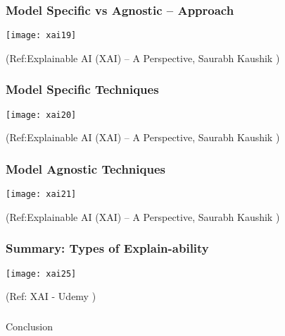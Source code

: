 \begin{frame}[fragile]\frametitle{Model Specific vs Agnostic – Approach}
\begin{center}
\texttt{[image: xai19]}
\end{center}

\tiny{(Ref:Explainable AI (XAI) – A Perspective, Saurabh Kaushik  )}
\end{frame}

\begin{frame}[fragile]\frametitle{ Model Specific Techniques}
\begin{center}
\texttt{[image: xai20]}
\end{center}

\tiny{(Ref:Explainable AI (XAI) – A Perspective, Saurabh Kaushik  )}
\end{frame}

\begin{frame}[fragile]\frametitle{ Model Agnostic Techniques}
\begin{center}
\texttt{[image: xai21]}
\end{center}

\tiny{(Ref:Explainable AI (XAI) – A Perspective, Saurabh Kaushik  )}
\end{frame}

\begin{frame}[fragile]\frametitle{Summary: Types of Explain-ability}

\begin{center}
\texttt{[image: xai25]}

\tiny{(Ref: XAI - Udemy  )}

\end{center}


\end{frame}


\begin{frame}[fragile]\frametitle{}
\begin{center}
{\Large Conclusion}
\end{center}
\end{frame}


